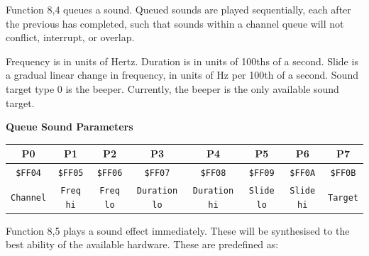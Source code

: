 \documentclass[12pt]{article}
\newcommand{\MonoSp}[1] {\fontsize{10pt}{10pt}\selectfont\texttt{#1}\normalsize}
\newcommand{\ParamsBytes}[9] {
  \fontsize{10pt}{10pt}\selectfont
  \textbf{#1}
  \newline
    \begin{tabular}{ | c | c | c | c | c | c | c | c | }                       \hline
      P0 & P1 & P2 & P3 & P4 & P5 & P6 & P7                                 \\
      \hline
      \MonoSp{\$FF04} & \MonoSp{\$FF05} & \MonoSp{\$FF06} & \MonoSp{\$FF07} &
      \MonoSp{\$FF08} & \MonoSp{\$FF09} & \MonoSp{\$FF0A} & \MonoSp{\$FF0B} \\ \hline
      \MonoSp{#2}     & \MonoSp{#3}     & \MonoSp{#4}     & \MonoSp{#5}     &
      \MonoSp{#6}     & \MonoSp{#7}     & \MonoSp{#8}     & \MonoSp{#9}     \\ \hline
    \end{tabular}
  \normalsize
  \newline
}
\begin{document}
Function 8,4 queues a sound. Queued sounds are played sequentially,
each after the previous has completed,
such that sounds within a channel queue will not conflict, interrupt, or overlap.
\newline

Frequency is in units of Hertz.
Duration is in units of 100ths of a second.
Slide is a gradual linear change in frequency, in units of Hz per 100th of a second.
Sound target type 0 is the beeper.
Currently, the beeper is the only available sound target.

\begin{center}
\ParamsBytes{Queue Sound Parameters}{Channel}{Freq hi}{Freq lo}{Duration lo}
                                    {Duration hi}{Slide lo}{Slide hi}{Target}
\end{center}

Function 8,5 plays a sound effect immediately. These will be synthesised to the best
ability of the available hardware. These are predefined as:
\end{document}
